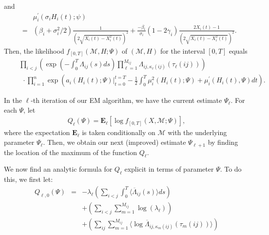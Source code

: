 \documentclass[12pt]{article}%
\begin{document}
and
\begin{eqnarray*}
&\ & \mu_i^\prime(\sigma_i H_i(t);\psi) \\
&= &
\left(\beta_i + {\sigma_i^2}/2\right)
\frac{1}{\left(2\sqrt{X_i(t) - X_i^2(t)}\right)^2}
+
\frac{-\beta_i}{\sigma_i} (1-2\gamma_i)
\frac{2X_i(t)-1}{\left(2\sqrt{X_i(t) - X_i^2(t)}\right)^2}.
\end{eqnarray*}
Then, the likelihood $f_{[0,T]}(\mathcal M,H;\Psi)$ of $(\mathcal M,H)$ for the interval $[0,T]$ equals
\begin{eqnarray*}
&\ & \prod_{i<j} \left( \exp\left(-\int_0^{T} \Lambda_{ij}(s)ds\right) \prod_{\ell=1}^{M_{ij}}\Lambda_{ij,\kappa_\ell(ij)}(\tau_\ell(ij))\right)\\
&\ & \ \ \cdot
\prod_{i=1}^n \exp\left(
\left. a_i(H_i(t);\Psi) \right|_{t=0}^{t=T}-\frac{1}{2} \int_0^T \mu_i^2(H_i(t);\Psi) + \mu_i^\prime(H_i(t),\Psi) dt\right).
\end{eqnarray*}

In the $\ell$-th iteration of our EM algorithm, we have the current estimate $\Psi_\ell$.  For each $\Psi$, let
\begin{eqnarray}
Q_{\ell}(\Psi) = \mathbf E_{\ell}
\left[
\log f_{[0,T]}(X,\mathcal M;\Psi)
\right],
\end{eqnarray}
where the expectation $\mathbf E_\ell$ is taken conditionally on $\mathcal M$ with the underlying parameter $\Psi_\ell$. Then, we obtain our next (improved) estimate $\Psi_{\ell+1}$ by finding the location of the maximum of the function $Q_{\ell}$.

We now find an analytic formula for $Q_\ell$ explicit in terms of parameter $\Psi$. 
To do this, we first let:
\begin{eqnarray*}
Q_{\ell,0}(\Psi) 
&=& -\lambda_\ell \left( \sum_{i<j} \int_0^T \langle \overline{\Lambda}_{ij}(s)\rangle ds\right)\\
& & + \left(\sum_{i<j} \sum_{m=1}^{M_{ij}} \log(\lambda_\ell) \right)\\
& & + \left( \sum_{ij} \sum_{m=1}^{M_{ij}} \langle \log \overline \Lambda_{ij,\kappa_{m}(ij)}(\tau_m(ij))\rangle \right)
\end{eqnarray*}
\end{document}
